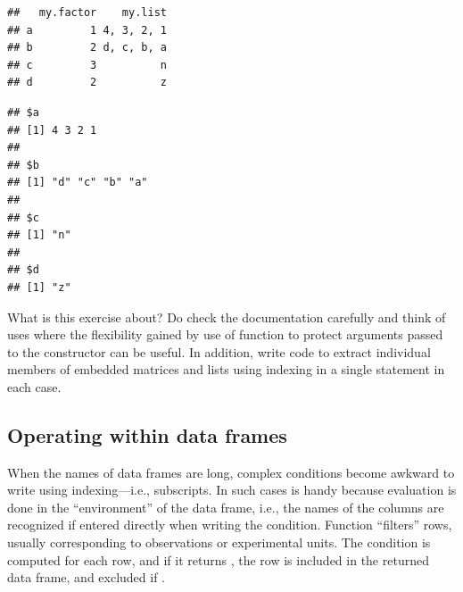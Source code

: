 \documentclass[krantz2]{krantz}\usepackage{knitr}
\begin{document}
\begin{advplayground}
\begin{knitrout}\footnotesize
{}\color{fgcolor}\begin{kframe}
\begin{alltt}
\hlkwb{<-}  
\end{alltt}
\begin{verbatim}
##   my.factor    my.list
## a         1 4, 3, 2, 1
## b         2 d, c, b, a
## c         3          n
## d         2          z
\end{verbatim}
\begin{alltt}
\hlopt{$}
\end{alltt}
\begin{verbatim}
## $a
## [1] 4 3 2 1
## 
## $b
## [1] "d" "c" "b" "a"
## 
## $c
## [1] "n"
## 
## $d
## [1] "z"
\end{verbatim}
\end{kframe}
\end{knitrout}

What is this exercise about? Do check the documentation carefully and think of uses where the flexibility gained by use of function  to protect arguments passed to the  constructor can be useful. In addition, write code to extract individual members of embedded matrices and lists using indexing in a single \Rlang statement in each case.
\end{advplayground}


\subsection{Operating within data frames}\label{sec:calc:df:with}
When the names of data frames are long, complex conditions become awkward to write using indexing---i.e., subscripts. In such cases  is handy because evaluation is done in the ``environment'' of the data frame, i.e., the names of the columns are recognized if entered directly when writing the condition. Function   ``filters'' rows, usually corresponding to observations or experimental units. The condition is computed for each row, and if it returns , the row is included in the returned data frame, and excluded if .
\end{document}
